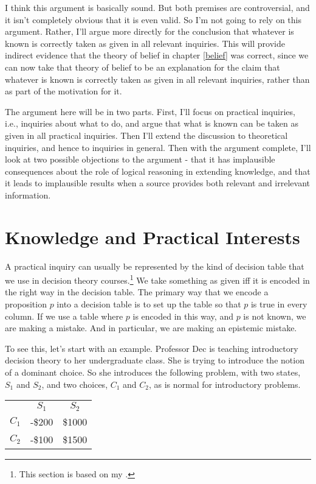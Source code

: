 \documentclass[11pt,]{book}
\let\rmarkdownfootnote\footnote%
\def\footnote{\protect\rmarkdownfootnote}
\def\toprule{}
\def\bottomrule{}
\begin{document}
I think this argument is basically sound. But both premises are controversial, and it isn't completely obvious that it is even valid. So I'm not going to rely on this argument. Rather, I'll argue more directly for the conclusion that whatever is known is correctly taken as given in all relevant inquiries. This will provide indirect evidence that the theory of belief in chapter \ref{belief} was correct, since we can now take that theory of belief to be an explanation for the claim that whatever is known is correctly taken as given in all relevant inquiries, rather than as part of the motivation for it.

The argument here will be in two parts. First, I'll focus on practical inquiries, i.e., inquiries about what to do, and argue that what is known can be taken as given in all practical inquiries. Then I'll extend the discussion to theoretical inquiries, and hence to inquiries in general. Then with the argument complete, I'll look at two possible objections to the argument - that it has implausible consequences about the role of logical reasoning in extending knowledge, and that it leads to implausible results when a source provides both relevant and irrelevant information.

\hypertarget{structure}{%
\section{Knowledge and Practical Interests}\label{structure}}

A practical inquiry can usually be represented by the kind of decision table that we use in decision theory courses.\footnote{This section is based on my \citeyearpar[sect 1.1]{Weatherson2012}.} We take something as given iff it is encoded in the right way in the decision table. The primary way that we encode a proposition \(p\) into a decision table is to set up the table so that \(p\) is true in every column. If we use a table where \(p\) is encoded in this way, and \(p\) is not known, we are making a mistake. And in particular, we are making an epistemic mistake.

To see this, let's start with an example. Professor Dec is teaching introductory decision theory to her undergraduate class. She is trying to introduce the notion of a dominant choice. So she introduces the following problem, with two states, \(S_1\) and \(S_2\), and two choices, \(C_1\) and \(C_2\), as is normal for introductory problems.

\begin{longtable}[]{@{}lcc@{}}
\toprule
\endhead
& \(S_1\) & \(S_2\)\tabularnewline
\(C_1\) & -\$200 & \$1000\tabularnewline
\(C_2\) & -\$100 & \$1500\tabularnewline
\bottomrule
\end{longtable}
\end{document}

